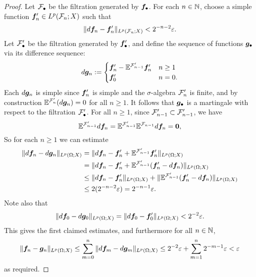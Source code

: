 \begin{proof}
  Let $\mathcal{F}_{\bullet}$ be the filtration generated by $\bm{f}_{\bullet}$.
  For each $n \in \mathbb{N}$, choose a simple function $\bm{f}_{n}' \in L^p(\mathcal{F}_{n};X)$ such that
  \begin{equation*}
    \|d\bm{f}_{n} - \bm{f}_{n}'\|_{L^p(\mathcal{F}_{n};X)} < 2^{-n-2}\varepsilon.
  \end{equation*}
  Let $\mathcal{F}'_{\bullet}$ be the filtration generated by $\bm{f}'_{\bullet}$, and define the sequence of functions $\bm{g}_{\bullet}$ via its difference sequence:
  \begin{equation*}
    d\bm{g}_{n} :=
    \begin{cases} \bm{f}'_{n} - \mathbb{E}^{\mathcal{F}'_{n-1}} \bm{f}'_{n} & n \geq 1 \\
      \bm{f}'_{0} & n = 0.
    \end{cases}
  \end{equation*}
  Each $d\bm{g}_{n}$ is simple since $\bm{f}'_{n}$ is simple and the $\sigma$-algebra $\mathcal{F}'_{n}$ is finite, and by construction $\mathbb{E}^{\mathcal{F}'_{n}}(d\bm{g}_{n}) = 0$ for all $n \geq 1$.
  It follows that $\bm{g}_{\bullet}$ is a martingale with respect to the filtration $\mathcal{F}'_{\bullet}$.
  For all $n \geq 1$, since $\mathcal{F}_{n-1}' \subset \mathcal{F}_{n-1}'$, we have
  \begin{equation*}
    \mathbb{E}^{\mathcal{F}_{n-1}'} d\bm{f}_{n} = \mathbb{E}^{\mathcal{F}_{n-1}'}\mathbb{E}^{\mathcal{F}_{n-1}} d\bm{f}_{n} = \bm{0},
  \end{equation*}
  So for each $n \geq 1$ we can estimate
  \begin{equation*}
    \begin{aligned}
      \|d\bm{f}_{n} - d\bm{g}_{n}\|_{L^p(\Omega;X)}
      &= \|d\bm{f}_{n} - \bm{f}_{n}' + \mathbb{E}^{\mathcal{F}_{n-1}'} \bm{f}_{n}'\|_{L^p(\Omega;X)} \\
      &= \|d\bm{f}_{n} - \bm{f}_{n}' + \mathbb{E}^{\mathcal{F}_{n-1}'} (\bm{f}_{n}' - d\bm{f}_{n})\|_{L^p(\Omega;X)} \\
      &\leq \|d\bm{f}_{n} - \bm{f}_{n}'\|_{L^p(\Omega;X)} + \|\mathbb{E}^{\mathcal{F}_{n-1}'} (\bm{f}_{n}' - d\bm{f}_{n})\|_{L^p(\Omega;X)} \\
      &\leq 2(2^{-n-2}\varepsilon) = 2^{-n-1}\varepsilon.
    \end{aligned}
  \end{equation*}
  Note also that
  \begin{equation*}
    \|d\bm{f}_{0} - d\bm{g}_{0}\|_{L^p(\Omega;X)} = \|d\bm{f}_{0} - \bm{f}_{0}'\|_{L^p(\Omega;X)} < 2^{-2}\varepsilon.
  \end{equation*}
  This gives the first claimed estimates, and furthermore for all $n \in \mathbb{N}$,
  \begin{equation*}
    \|\bm{f}_{n} - \bm{g}_{n}\|_{L^p(\Omega;X)}
    \leq \sum_{m=0}^{n} \|d\bm{f}_{m} - d\bm{g}_{m}\|_{L^p(\Omega;X)} 
    \leq 2^{-2} \varepsilon + \sum_{m=1}^{n} 2^{-m-1}\varepsilon < \varepsilon
  \end{equation*}
  as required.
\end{proof}

